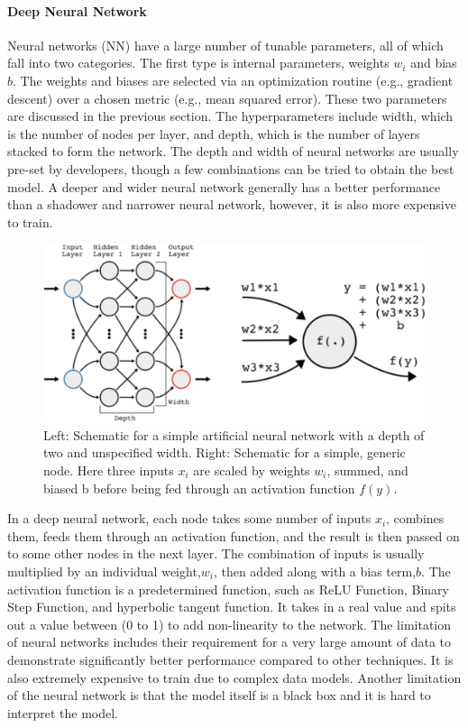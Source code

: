 \documentclass[aps,prb,twocolumn,superscriptaddress,floatfix]{revtex4-2}
\newcounter{para}
\begin{document}
\paragraph{Deep Neural Network}
Neural networks (NN) have a large number of tunable parameters, all of which fall into two categories\cite{George_2018}. The first type is internal parameters, weights $w_i$ and bias $b$. The weights and biases are selected via an optimization routine (e.g., gradient descent) over a chosen metric (e.g., mean squared error). These two parameters are discussed in the previous section.
The hyperparameters include width, which is the number of nodes per layer, and depth, which is the number of layers stacked to form the network. The depth and width of neural networks are usually pre-set by developers, though a few combinations can be tried to obtain the best model. A deeper and wider neural network generally has a better performance than a shadower and narrower neural network, however, it is also more expensive to train.
\cite{Hinners_2018}
\begin{figure}[h]
    \includegraphics[clip=true,width=\columnwidth]{NN.jpeg}
    \caption{Left: Schematic for a simple artificial neural network with a depth of two and unspecified width. Right: Schematic for a simple, generic node. Here three inputs $x_i$ are scaled by weights $w_i$, summed, and biased b before being fed through an activation function $f(y)$\cite{Hinners_2018}.}
\end{figure}
In a deep neural network, each node takes some number of inputs $x_i$, combines them, feeds them through an activation function, and the result is then passed on to some other nodes in the next layer. The combination of inputs is usually multiplied by an individual weight,$w_i$, then added along with a bias term,$b$. 
The activation function is a predetermined function, such as ReLU Function, Binary Step Function, and hyperbolic tangent function. It takes in a real value and spits out a value between (0 to 1) to add non-linearity to the network\cite{v7labsActivationFunctions}.
The limitation of neural networks includes their requirement for a very large amount of data to demonstrate significantly better performance compared to other techniques. It is also extremely expensive to train due to complex data models.
Another limitation of the neural network is that the model itself is a black box and it is hard to interpret the model.
\end{document}
